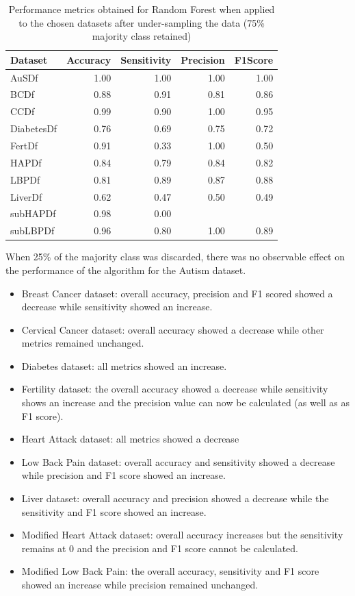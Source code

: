 \begin{table}[ht]
\centering
\begin{tabular}{lrrrr}
  \hline
  \rowcolor{LightCyan}
Dataset & Accuracy & Sensitivity & Precision & F1Score \\ 
  \hline
AuSDf & 1.00 & 1.00 & 1.00 & 1.00 \\ 
  BCDf & 0.88 & 0.91 & 0.81 & 0.86 \\ 
  CCDf & 0.99 & 0.90 & 1.00 & 0.95 \\ 
  DiabetesDf & 0.76 & 0.69 & 0.75 & 0.72 \\ 
  FertDf & 0.91 & 0.33 & 1.00 & 0.50 \\ 
  HAPDf & 0.84 & 0.79 & 0.84 & 0.82 \\ 
  LBPDf & 0.81 & 0.89 & 0.87 & 0.88 \\ 
  LiverDf & 0.62 & 0.47 & 0.50 & 0.49 \\ 
  subHAPDf & 0.98 & 0.00 &  &  \\ 
  subLBPDf & 0.96 & 0.80 & 1.00 & 0.89 \\ 
   \hline
\end{tabular}
\caption{Performance metrics obtained for Random Forest when applied to the chosen datasets after under-sampling the data (75\% majority class retained)}
\end{table}

When 25\% of the majority class was discarded, there was no observable effect on the performance of the algorithm for the Autism dataset.
\begin{itemize}
    \item Breast Cancer dataset: overall accuracy, precision and F1 scored showed a decrease while sensitivity showed an increase.
    \item Cervical Cancer dataset: overall accuracy showed a decrease while other metrics remained unchanged.
    \item Diabetes dataset: all metrics showed an increase.
    \item Fertility dataset: the overall accuracy showed a decrease while sensitivity shows an increase and the precision value can now be calculated (as well as as F1 score).
    \item Heart Attack dataset: all metrics showed a decrease
    \item Low Back Pain dataset: overall accuracy and sensitivity showed a decrease while precision and F1 score showed an increase.
    \item Liver dataset: overall accuracy and precision showed a decrease while the sensitivity and F1 score showed an increase.
    \item Modified Heart Attack dataset: overall accuracy increases but the sensitivity remains at 0 and the precision and F1 score cannot be calculated.
    \item Modified Low Back Pain: the overall accuracy, sensitivity and F1 score showed an increase while precision remained unchanged.
\end{itemize}

